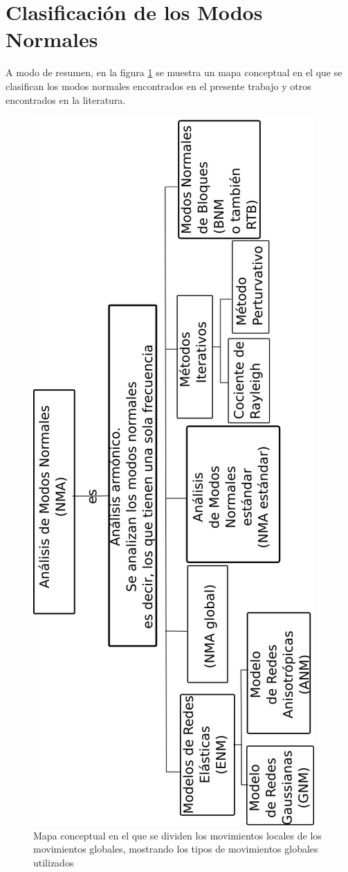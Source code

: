\section{Clasificaci\'{o}n de los Modos Normales}
A modo de resumen, en la figura \ref{fig:movs} se muestra un mapa conceptual en el que se clasifican los modos normales encontrados en el presente trabajo y otros encontrados en la literatura.\\
\begin{figure}[h]
\centering%
%
\includegraphics[scale=0.5, angle=-90]{Kap2/mapa.png}%
\caption{Mapa conceptual en el que se dividen los movimientos locales de los movimientos globales, mostrando los tipos de movimientos globales utilizados} \label{fig:movs}
\end{figure}
\newpage
